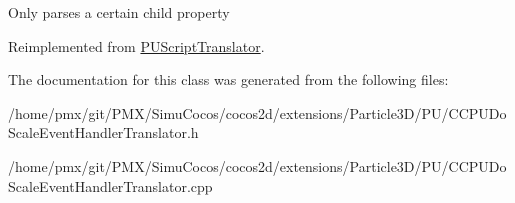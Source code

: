 Only parses a certain child property 

Reimplemented from \hyperlink{classPUScriptTranslator_a0374d83a8a04e57918975d525e0f8fe8}{P\+U\+Script\+Translator}.



The documentation for this class was generated from the following files\+:\begin{DoxyCompactItemize}
\item 
/home/pmx/git/\+P\+M\+X/\+Simu\+Cocos/cocos2d/extensions/\+Particle3\+D/\+P\+U/C\+C\+P\+U\+Do\+Scale\+Event\+Handler\+Translator.\+h\item 
/home/pmx/git/\+P\+M\+X/\+Simu\+Cocos/cocos2d/extensions/\+Particle3\+D/\+P\+U/C\+C\+P\+U\+Do\+Scale\+Event\+Handler\+Translator.\+cpp\end{DoxyCompactItemize}
